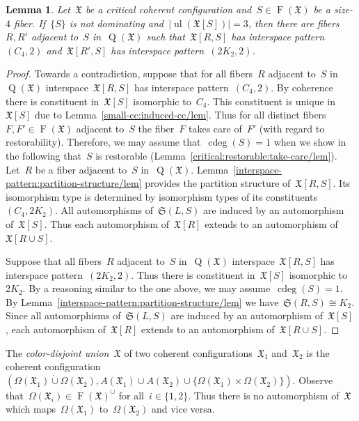 \documentclass[english,a4paper]{article}
\theoremstyle{plain}
\newtheorem{lemma}      [theorem]{Lemma}
\theoremstyle{definition}
\newcommand{\disjointUnion}{\ensuremath{\mathbin{\dot{\cup}}}}
\DeclareMathOperator{\Fibers}{F}
\newcommand{\coherentConfig}{\ensuremath{\mathfrak{X}}}
\newcommand{\fibers}[1]{\ensuremath{\Fibers \left( #1 \right)}}
\newcommand{\interspace}[2]{\ensuremath{\coherentConfig[#1,#2]}}
\newcommand{\inducedCC}[1]{\ensuremath{\coherentConfig[#1]}}
\DeclareMathOperator*{\ul}{ul}
\newcommand{\vertices}{\ensuremath{\Omega}}
\newcommand{\arcs}{\ensuremath{A}}
\DeclareMathOperator*{\Quotient}{Q}
\newcommand{\quotientGraph}[1]{\ensuremath{\Quotient(#1)}}
\DeclareMathOperator{\ColorDeg}{cdeg}
\newcommand{\colorDeg}[1]{\ensuremath{\ColorDeg\left(#1\right)}}
\newcommand{\partitionStructure}[1]{\ensuremath{\mathfrak{S}(#1)}}
\newcommand{\ipfourMatching}{\ensuremath{(\disjointCliques{2}{2},2)}}
\newcommand{\ipfourCycle}   {\ensuremath{(\cycle{4},2)}}
\newcommand{\clique}[1]{\ensuremath{K_{#1}}}
\newcommand{\cycle}[1]{\ensuremath{C_{#1}}}
\newcommand{\disjointCliques}[2]{\ensuremath{#1 \clique{#2}}}
\begin{document}
\begin{lemma}
    \label{critical:4cc:restorable:2,C4/lem}
    Let~$\coherentConfig$ be a critical coherent configuration and~$S \in \fibers{\coherentConfig}$ be a size-$4$ fiber.
    If~$\{S\}$ is not dominating and~$|\ul(\inducedCC{S})| = 3$, then there are fibers~$R,R'$ adjacent to~$S$ in~$\quotientGraph{\coherentConfig}$ such that~$\interspace{R}{S}$ has interspace pattern~$\ipfourCycle$ and~$\interspace{R'}{S}$ has interspace pattern~$\ipfourMatching$.
\end{lemma}
\begin{proof}
    Towards a contradiction, suppose that for all fibers~$R$ adjacent to~$S$ in~$\quotientGraph{\coherentConfig}$ interspace~$\interspace{R}{S}$ has interspace pattern~$\ipfourCycle$.
    By coherence there is constituent in~$\inducedCC{S}$ isomorphic to~$\cycle{4}$.
    This constituent is unique in~$\inducedCC{S}$ due to Lemma~\ref{small-cc:induced-cc/lem}.
    Thus for all distinct fibers~$F,F' \in \fibers{\coherentConfig}$ adjacent to~$S$ the fiber~$F$ takes care of~$F'$ (with regard to restorability).
    Therefore, we may assume that~$\colorDeg{S} = 1$ when we show in the following that~$S$ is restorable (Lemma~\ref{critical:restorable:take-care/lem}).
    Let~$R$ be a fiber adjacent to~$S$ in~$\quotientGraph{\coherentConfig}$.
    Lemma~\ref{interspace-pattern:partition-structure/lem} provides the partition structure of~$\interspace{R}{S}$.
    Its isomorphism type is determined by isomorphism types of its constituents~$(C_4,2K_2)$.
    All automorphisms of~$\partitionStructure{L,S}$ are induced by an automorphism of~$\inducedCC{S}$.
    Thus each automorphism of~$\inducedCC{R}$ extends to an automorphism of~$\inducedCC{R \cup S}$.

    Suppose that all fibers~$R$ adjacent to~$S$ in~$\quotientGraph{\coherentConfig}$ interspace~$\interspace{R}{S}$ has interspace pattern~$\ipfourMatching$.
    Thus there is constituent in~$\inducedCC{S}$ isomorphic to~$\disjointCliques{2}{2}$.
    By a reasoning similar to the one above, we may assume~$\colorDeg{S} = 1$.
    By  Lemma~\ref{interspace-pattern:partition-structure/lem} we have~$\partitionStructure{R,S} \cong K_2$.
    Since all automorphisms of~$\partitionStructure{L,S}$ are induced by an automorphism of~$\inducedCC{S}$, each automorphism of~$\inducedCC{R}$ extends to an automorphism of~$\inducedCC{R \cup S}$.
\end{proof}


The \emph{color-disjoint union~$\coherentConfig$} of two coherent configurations~$\coherentConfig_1$ and~$\coherentConfig_2$ is the coherent configuration~$(\vertices(\coherentConfig_1) \disjointUnion \vertices(\coherentConfig_2), \arcs(\coherentConfig_1) \cup \arcs(\coherentConfig_2) \cup \{\vertices(\coherentConfig_1) \times \vertices(\coherentConfig_2)\})$.
Observe that~$\vertices(\coherentConfig_i) \in \fibers{\coherentConfig}^\cup$ for all~$i \in \{1,2\}$.
Thus there is no automorphism of~$\coherentConfig$ which maps~$\vertices(\coherentConfig_1)$ to~$\vertices(\coherentConfig_2)$ and vice versa.
\end{document}
